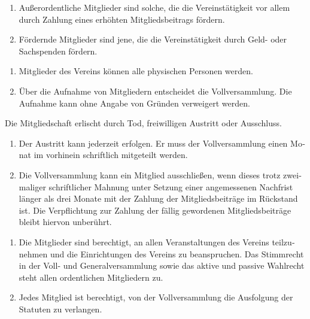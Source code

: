 \begin{otherlanguage}{german}
\begin{enumerate}[statutenenum]
    \item Außerordentliche Mitglieder sind solche, die die Vereinstätigkeit vor allem durch Zahlung eines erhöhten Mitgliedsbeitrags fördern.

    \item Fördernde Mitglieder sind jene, die die Vereinstätigkeit durch Geld- oder Sachspenden fördern.
\end{enumerate}


\begin{enumerate}[statutenenum]
    \item Mitglieder des Vereins können alle physischen Personen werden.

    \item Über die Aufnahme von Mitgliedern entscheidet die Vollversammlung.
        Die Aufnahme kann ohne Angabe von Gründen verweigert werden.
\end{enumerate}


Die Mitgliedschaft erlischt durch Tod, freiwilligen Austritt oder Ausschluss.

\begin{enumerate}[statutenenum]
    \item Der Austritt kann jederzeit erfolgen.
        Er muss der Vollversammlung einen Monat im vorhinein schriftlich mitgeteilt werden.

    \item Die Vollversammlung kann ein Mitglied ausschließen, wenn dieses trotz zweimaliger schriftlicher Mahnung unter Setzung einer angemessenen Nachfrist länger als drei Monate mit der Zahlung der Mitgliedsbeiträge im Rückstand ist.
        Die Verpflichtung zur Zahlung der fällig gewordenen Mitgliedsbeiträge bleibt hiervon unberührt.
\end{enumerate}


\begin{enumerate}[statutenenum]
    \item Die Mitglieder sind berechtigt, an allen Veranstaltungen des Vereins teilzunehmen und die Einrichtungen des Vereins zu beanspruchen.
        Das Stimmrecht in der Voll- und Generalversammlung sowie das aktive und passive Wahlrecht steht allen ordentlichen Mitgliedern zu.

    \item Jedes Mitglied ist berechtigt, von der Vollversammlung die Ausfolgung der Statuten zu verlangen.


\end{enumerate}
\end{otherlanguage}
